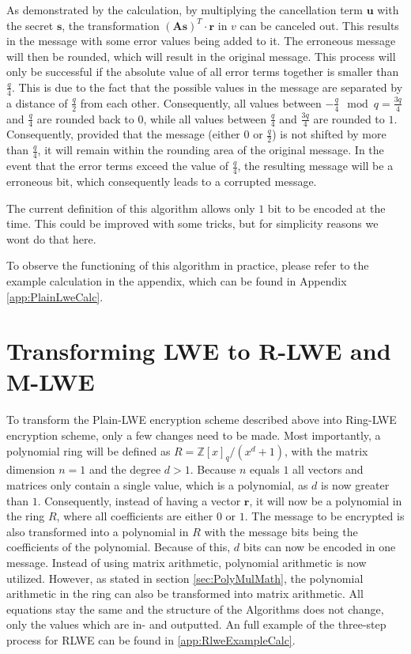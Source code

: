 As demonstrated by the calculation, by multiplying the cancellation term $\textbf{u}$ with the secret $\textbf{s}$, the transformation $(\textbf{As})^T \cdot \textbf{r}$ in $v$ can be canceled out. This results in the message with some error values being added to it. The erroneous message will then be rounded, which will result in the original message. This process will only be successful if the absolute value of all error terms together is smaller than $\frac{q}{4}$. This is due to the fact that the possible values in the message are separated by a distance of $\frac{q}{2}$ from each other. Consequently, all values between $-\frac{q}{4}\mod q=\frac{3q}{4}$ and $\frac{q}{4}$ are rounded back to $0$, while all values between $\frac{q}{4}$ and $\frac{3q}{4}$ are rounded to $1$. Consequently, provided that the message (either $0$ or $\frac{q}{2}$) is not shifted by more than $\frac{q}{4}$, it will remain within the rounding area of the original message. In the event that the error terms exceed the value of $\frac{q}{4}$, the resulting message will be a erroneous bit, which consequently leads to a corrupted message.


The current definition of this algorithm allows only $1$ bit to be encoded at the time. This could be improved with some tricks, but for simplicity reasons we wont do that here. 

To observe the functioning of this algorithm in practice, please refer to the example calculation in the appendix, which can be found in Appendix \ref{app:PlainLweCalc}.

\section{Transforming LWE to R-LWE and M-LWE}
\label{sec:TransformingLweToRlweAndMlwe}

To transform the Plain-LWE encryption scheme described above into Ring-LWE encryption scheme, only a few changes need to be made. Most importantly, a polynomial ring will be defined as $R = \mathbb{Z}[x]_q/(x^d+1)$, with the matrix dimension $n=1$ and the degree $d>1$. Because $n$ equals $1$ all vectors and matrices only contain a single value, which is a polynomial, as $d$ is now greater than $1$. Consequently, instead of having a vector $\textbf{r}$, it will now be a polynomial in the ring $R$, where all coefficients are either $0$ or $1$. The message to be encrypted is also transformed into a polynomial in $R$ with the message bits being the coefficients of the polynomial. Because of this, $d$ bits can now be encoded in one message. Instead of using matrix arithmetic, polynomial arithmetic is now utilized. However, as stated in section \ref{sec:PolyMulMath}, the polynomial arithmetic in the ring can also be transformed into matrix arithmetic. All equations stay the same and the structure of the Algorithms does not change, only the values which are in- and outputted. An full example of the three-step process for RLWE can be found in \ref{app:RlweExampleCalc}.


